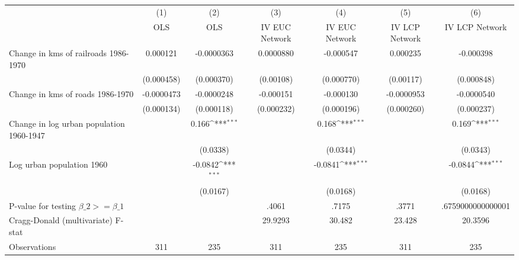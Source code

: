 {
\def\sym#1{\ifmmode^{#1}\else\(^{#1}\)\fi}
\begin{tabular}{l*{6}{c}}
\hline\hline
                &\multicolumn{1}{c}{(1)}&\multicolumn{1}{c}{(2)}&\multicolumn{1}{c}{(3)}&\multicolumn{1}{c}{(4)}&\multicolumn{1}{c}{(5)}&\multicolumn{1}{c}{(6)}\\
                &\multicolumn{1}{c}{OLS}&\multicolumn{1}{c}{OLS}&\multicolumn{1}{c}{IV EUC Network}&\multicolumn{1}{c}{IV EUC Network}&\multicolumn{1}{c}{IV LCP Network}&\multicolumn{1}{c}{IV LCP Network}\\
\hline
Change in kms of railroads 1986-1970& 0.000121         &-0.0000363         &0.0000880         &-0.000547         & 0.000235         &-0.000398         \\
                &(0.000458)         &(0.000370)         &(0.00108)         &(0.000770)         &(0.00117)         &(0.000848)         \\
[1em]
Change in kms of roads 1986-1970&-0.0000473         &-0.0000248         &-0.000151         &-0.000130         &-0.0000953         &-0.0000540         \\
                &(0.000134)         &(0.000118)         &(0.000232)         &(0.000196)         &(0.000260)         &(0.000237)         \\
[1em]
Change in log urban population 1960-1947&                  &    0.166\sym{***}&                  &    0.168\sym{***}&                  &    0.169\sym{***}\\
                &                  & (0.0338)         &                  & (0.0344)         &                  & (0.0343)         \\
[1em]
Log urban population 1960&                  &  -0.0842\sym{***}&                  &  -0.0841\sym{***}&                  &  -0.0844\sym{***}\\
                &                  & (0.0167)         &                  & (0.0168)         &                  & (0.0168)         \\
\hline
P-value for testing $\beta\_{2} >= \beta\_{1}$&                  &                  &    .4061         &    .7175         &    .3771         &.6759000000000001         \\
Cragg-Donald (multivariate) F-stat&                  &                  &  29.9293         &   30.482         &   23.428         &  20.3596         \\
Observations    &      311         &      235         &      311         &      235         &      311         &      235         \\
\hline\hline
\end{tabular}
}
